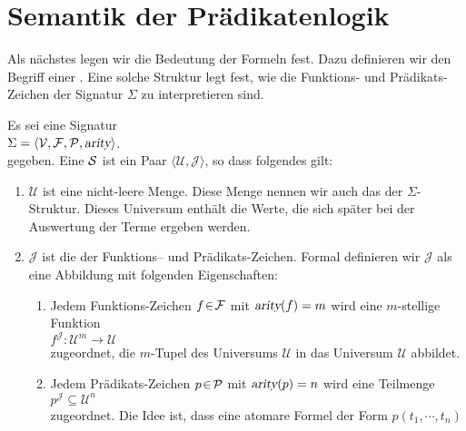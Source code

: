 \section{Semantik der Prädikatenlogik \label{sec:semantik}}
Als nächstes legen wir die Bedeutung der Formeln fest.  Dazu definieren wir 
den Begriff einer .  Eine solche Struktur legt fest, wie die
Funktions- und Prädikats-Zeichen der Signatur $\Sigma$ zu interpretieren sind.

\begin{Definition}[Struktur]
    Es sei eine  Signatur \\[0.2cm]
    \hspace*{1.3cm} $\Sigma = \langle \mathcal{V}, \mathcal{F}, \mathcal{P}, \textsl{arity} \rangle$. \\[0.2cm]
    gegeben. Eine  $\mathcal{S}$ ist ein
    Paar $\langle \mathcal{U}, \mathcal{J} \rangle$, so dass folgendes gilt:
    \begin{enumerate}
        \item $\mathcal{U}$ ist eine nicht-leere Menge. Diese Menge nennen wir auch das
               der $\Sigma$-Struktur.  Dieses Universum enthält die Werte,
              die sich später bei der Auswertung der Terme ergeben werden.
        \item $\mathcal{J}$ ist die  der Funktions-- und Prädikats-Zeichen.
              Formal definieren wir $\mathcal{J}$ als eine Abbildung mit folgenden Eigenschaften:
        \begin{enumerate}
        \item Jedem Funktions-Zeichen $f \!\in\! \mathcal{F}$ mit $\textsl{arity}(f) = m$ wird
              eine $m$-stellige Funktion \\[0.2cm]
              \hspace*{1.3cm}
              $f^\mathcal{J}\colon \mathcal{U}^m \rightarrow \mathcal{U}$ \\[0.2cm]
              zugeordnet, die $m$-Tupel des Universums $\mathcal{U}$ in das Universum $\mathcal{U}$ abbildet.
        \item Jedem Prädikats-Zeichen $p \!\in\! \mathcal{P}$ mit $\textsl{arity}(p) = n$ wird
              eine Teilmenge \\[0.2cm]
              \hspace*{1.3cm} 
              $p^\mathcal{J} \subseteq \mathcal{U}^n$ \\[0.2cm]
              zugeordnet.  Die Idee ist, dass eine atomare Formel der Form $p(t_1, \cdots, t_n)$

\end{enumerate}
\end{enumerate}
\end{Definition}
